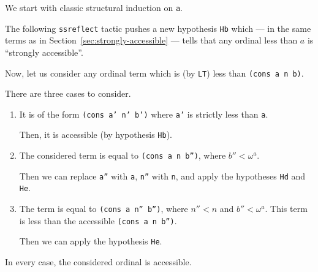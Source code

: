 We start with classic structural induction on \texttt{a}.

The following \texttt{ssreflect} tactic  pushes a new hypothesis \texttt{Hb} which --- in the same terms as in Section~\vref{sec:strongly-accessible} --- tells that any ordinal less than $a$ is ``strongly accessible''.


Now, let us consider any ordinal term which is (by \texttt{LT}) less than \texttt{(cons a n b)}.

There are three cases to consider.
\begin{enumerate}
\item It is of the form \texttt{(cons a' n' b')} where \texttt{a'} is strictly less than \texttt{a}.
  
  Then, it is accessible (by hypothesis \texttt{Hb}).
  
  \item The considered term  is equal to
    \texttt{(cons a n b'')}, where $b''<\omega^a$. 
    
    Then we can replace \texttt{a''} with \texttt{a}, \texttt{n''} with \texttt{n}, and apply the hypotheses \texttt{Hd} and \texttt{He}.
    
\item
  The term is equal to
  \texttt{(cons a n'' b'')}, where $n''<n$ and $b''<\omega^a$.
  This term is less than the accessible \texttt{(cons a n b'')}.
  
  
  
 Then we can apply the hypothesis \texttt{He}.
 
\end{enumerate}

In every case, the considered ordinal is accessible.
